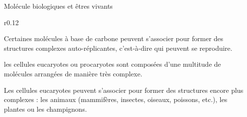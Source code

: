 \begin{doc}{Molécule biologiques et êtres vivants}
  \begin{wrapfigure}[2]{r}{0.12\linewidth}
    \vspace*{-28pt}
    \centering  
  \end{wrapfigure}
  \strut\vspace*{-20pt}
  
  \begin{importants}
    Certaines molécules à base de carbone peuvent s'associer pour former des structures complexes auto-réplicantes, c'est-à-dire qui peuvent se reproduire.
  \end{importants}
  \exemple* les cellules eucaryotes ou procaryotes sont composées d'une multitude de molécules arrangées de manière très complexe.

  \begin{importants}
    Les cellules eucaryotes peuvent s'associer pour former des structures encore plus complexes : les animaux (mammifères, insectes, oiseaux, poissons, etc.), les plantes ou les champignons.
  \end{importants}

  \vspace*{-14pt}
  \begin{center}
  \end{center}
\end{doc}